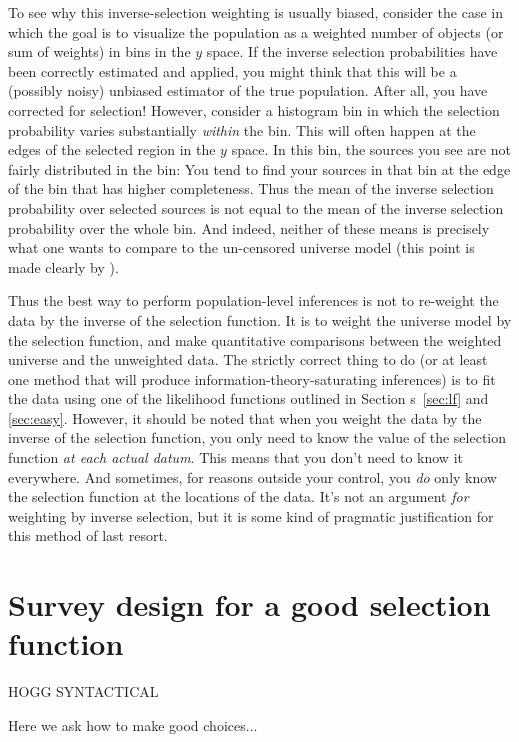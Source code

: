 \documentclass[modern]{aastex62}
\newcommand{\sectionname}{Section}
\begin{document}
To see why this inverse-selection weighting is usually biased,
consider the case in which the goal is to visualize the population as
a weighted number of objects (or sum of weights) in bins in the $y$
space.
If the inverse selection probabilities have been correctly estimated
and applied, you might think that this will be a (possibly noisy)
unbiased estimator of the true population.
After all, you have corrected for selection!
However, consider a histogram bin in which the selection probability
varies substantially \emph{within} the bin.
This will often happen at the edges of the selected region in the $y$
space.
In this bin, the sources you see are not fairly distributed in the
bin: You tend to find your sources in that bin at the edge of the bin
that has higher completeness.
Thus the mean of the inverse selection probability over selected
sources is not equal to the mean of the inverse selection probability
over the whole bin.
And indeed, neither of these means is precisely what one wants to
compare to the un-censored universe model (this point is made clearly
by \citealt{blogpost}).

Thus the best way to perform population-level inferences is not to
re-weight the data by the inverse of the selection function.  It is to
weight the universe model by the selection function, and make
quantitative comparisons between the weighted universe and the
unweighted data.
The strictly correct thing to do (or at least one method that will
produce information-theory-saturating inferences) is to fit the data
using one of the likelihood functions outlined in \sectionname
s~\ref{sec:lf} and \ref{sec:easy}.
However, it should be noted that when you weight the data by the
inverse of the selection function, you only need to know the value of
the selection function \emph{at each actual datum}.
This means that you don't need to know it everywhere.
And sometimes, for reasons outside your control, you \emph{do} only
know the selection function at the locations of the data.
It's not an argument \emph{for} weighting by inverse selection, but it
is some kind of pragmatic justification for this method of last
resort.

\section{Survey design for a good selection function}\label{sec:design}

HOGG SYNTACTICAL

Here we ask how to make good choices...
\end{document}
